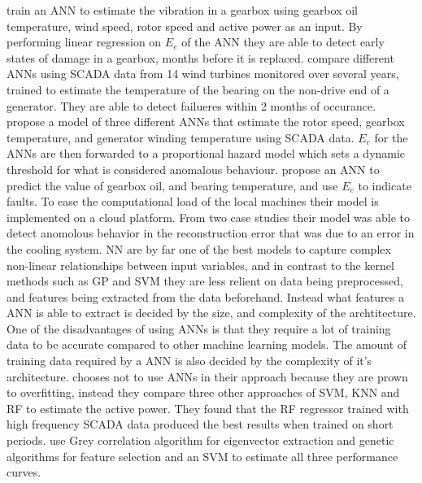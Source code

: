 \textcite{ANN_damage_detection_gearbox_wt} train an ANN to estimate the vibration in a gearbox using gearbox oil temperature, wind speed, rotor speed and active power as an input. 
By performing linear regression on $E_e$ of the ANN they are able to detect early states of damage in a gearbox, months before it is replaced. 
\textcite{detecting_malfunctions_wt_generator_bearings_generic_vs_specific_models} compare different ANNs using SCADA data from 14 wind turbines monitored over several years, trained to estimate the temperature of the bearing on the non-drive end of a generator. 
They are able to detect failueres within 2 months of occurance. 
\textcite{health_cond_model_nn_proportional_hazard_models} propose a model of three different ANNs that estimate the rotor speed, gearbox temperature, and generator winding temperature using SCADA data.
$E_e$ for the ANNs are then forwarded to a proportional hazard model which sets a dynamic threshold for what is considered anomalous behaviour.
\textcite{wt_cm_using_cloud_computing_and_HELM} propose an ANN to predict the value of gearbox oil, and bearing temperature, and use $E_e$ to indicate faults.
To ease the computational load of the local machines their model is implemented on a cloud platform. From two case studies their model was able to detect anomolous behavior in the reconstruction error that was due to an error in the cooling system. 
NN are by far one of the best models to capture complex non-linear relationships between input variables, and in contrast to the kernel methods such as GP and SVM they are less relient on data being preprocessed, and features being extracted from the data beforehand. 
Instead what features a ANN is able to extract is decided by the size, and complexity of the archtitecture. 
One of the disadvantages of using ANNs is that they require a lot of training data to be accurate compared to other machine learning models. 
The amount of training data required by a ANN is also decided by the complexity of it's architecture. 
\textcite{high_freq_scada_perf_monit_sensitivity} chooses not to use ANNs in their approach because they are prown to overfitting, instead they compare three other approaches of SVM, KNN and RF to estimate the active power. 
They found that the RF regressor trained with high frequency SCADA data produced the best results when trained on short periods. 
\textcite{abnormal_detection_scada_data_mining} use Grey correlation algorithm for eigenvector extraction and genetic algorithms for feature selection and an SVM to estimate all three performance curves.
